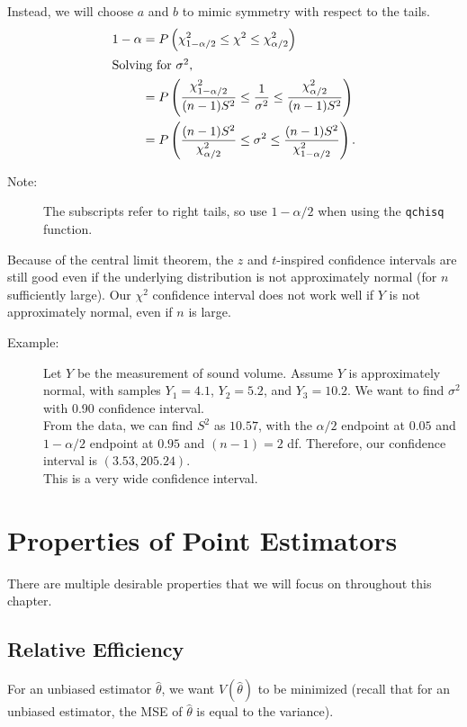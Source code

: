 \documentclass[10pt]{extarticle}
\begin{document}
  Instead, we will choose $a$ and $b$ to mimic symmetry with respect to the tails. \\
  \begin{align*}
    1-\alpha &= P\left(\chi^2_{1-\alpha/2} \leq \chi^2 \leq \chi^2_{\alpha/2}\right)\\
    \intertext{Solving for $\sigma^2$,}
             &= P\left(\frac{\chi^2_{1-\alpha/2}}{(n-1)S^2} \leq \frac{1}{\sigma^2} \leq \frac{\chi^2_{\alpha/2}}{(n-1)S^2}\right)\\
             &= P\left(\frac{(n-1)S^2}{\chi^2_{\alpha/2}} \leq \sigma^2 \leq \frac{(n-1)S^2}{\chi^2_{1-\alpha/2}}\right).
  \end{align*}
  \begin{description}
    \item[Note:] The subscripts refer to right tails, so use $1-\alpha/2$ when using the \verb|qchisq| function.
  \end{description}
  Because of the central limit theorem, the $z$ and $t$-inspired confidence intervals are still good even if the underlying distribution is not approximately normal (for $n$ sufficiently large). Our $\chi^2$ confidence interval does not work well if $Y$ is not approximately normal, even if $n$ is large.
  \begin{description}
    \item[Example:] Let $Y$ be the measurement of sound volume. Assume $Y$ is approximately normal, with samples $Y_1 = 4.1$, $Y_2 = 5.2$, and $Y_3 = 10.2$. We want to find $\sigma^2$ with 0.90 confidence interval.\\

      From the data, we can find $S^2$ as $10.57$, with the $\alpha/2$ endpoint at $0.05$ and $1-\alpha/2$ endpoint at $0.95$ and $(n-1) = 2$ df. Therefore, our confidence interval is $(3.53,205.24)$.\\

      This is a very wide confidence interval.
  \end{description}
  \section{Properties of Point Estimators}%
  There are multiple desirable properties that we will focus on throughout this chapter.
  \subsection{Relative Efficiency}%
  For an unbiased estimator $\hat{\theta}$, we want $V(\hat{\theta})$ to be minimized (recall that for an unbiased estimator, the MSE of $\hat{\theta}$ is equal to the variance).\\
\end{document}
